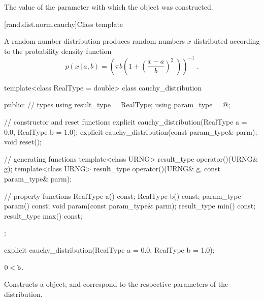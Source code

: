 \begin{itemdescr}
\pnum\returns The value of the  parameter
 with which the object was constructed.
\end{itemdescr}


[rand.dist.norm.cauchy]{Class template }%

\pnum
A  random number distribution
produces random numbers $x$
distributed according to
the probability density function%
%
\[%
 p(x\,|\,a,b)
      = \left( \pi b \left( 1 + \left( \frac{x-a}{b}  \right)^2 \;\right)\right)^{-1}
\; \mbox{.}
\]

\begin{codeblock}
template<class RealType = double>
 class cauchy_distribution
{
public:
 // types
 using result_type = RealType;
 using param_type  = @\unspec@;

 // constructor and reset functions
 explicit cauchy_distribution(RealType a = 0.0, RealType b = 1.0);
 explicit cauchy_distribution(const param_type& parm);
 void reset();

 // generating functions
 template<class URNG>
   result_type operator()(URNG& g);
 template<class URNG>
   result_type operator()(URNG& g, const param_type& parm);

 // property functions
 RealType a() const;
 RealType b() const;
 param_type param() const;
 void param(const param_type& parm);
 result_type min() const;
 result_type max() const;
};
\end{codeblock}


%
\begin{itemdecl}
explicit cauchy_distribution(RealType a = 0.0, RealType b = 1.0);
\end{itemdecl}

\begin{itemdescr}
\pnum\requires
 $ 0 < \texttt{b} $.

\pnum\effects Constructs a  object;
  and 
 correspond to the respective parameters of the distribution.
\end{itemdescr}

